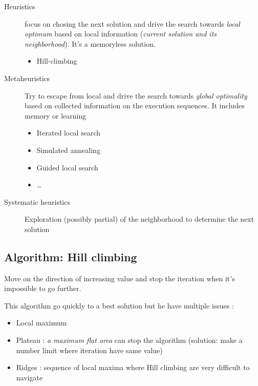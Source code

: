 \begin{description}

    \item[Heuristics] focus on  chosing the next solution  and drive the
    search  towards \textit{local  optimum} based  on local  information
    (\textit{current solution and its  neighborhood}). It's a memoryless
    solution.

        \begin{itemize}
            \item Hill-climbing
            \end{itemize}

    \item[Metaheuristics] Try to escape from  local and drive the search
    towards  \textit{global optimality}  based on  collected information
    on  the   execution  sequences.  It  includes   memory  or  learning

        \begin{itemize}
            \item Iterated local search
            \item Simulated annealing
            \item Guided local search
            \item \ldots
            \end{itemize}

    \item[Systematic heuristics]  Exploration (possibly partial)  of the
neighborhood to determine the next solution

\end{description}

\subsection{Algorithm: Hill climbing}

Move on  the direction of increasing  value and stop the  iteration when
it's impossible to go further.

This algorithm go quickly to a best solution but he have multiple issues :
\begin{itemize}
    \item Local maximum 
    \item Plateau : \textit{a maximum flat area} can stop the algorithm (solution:
        make a number limit where iteration have same value)
    \item Ridges : sequence of local maxima where Hill climbing are very difficult to navigate
\end{itemize}


